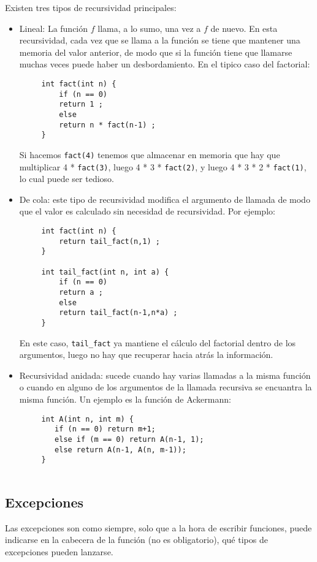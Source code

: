 \documentclass[a4paper]{article}
\begin{document}
	 Existen tres tipos de recursividad principales:
	 \begin{itemize}
	 \item Lineal: La función $f$ llama, a lo sumo, una vez a $f$ de nuevo. En esta recursividad, cada vez que se llama a la función se tiene que mantener una memoria del valor anterior, de modo que si la función tiene que llamarse muchas veces puede haber un desbordamiento. En el tipico caso del factorial:
	 \begin{verbatim}
	 int fact(int n) {
		 if (n == 0)
		 return 1 ;
		 else
		 return n * fact(n-1) ;
	 }
	 \end{verbatim}
	 Si hacemos \verb|fact(4)| tenemos que almacenar en memoria que hay que multiplicar 4 * \verb|fact(3)|, luego 4 * 3 * \verb|fact(2)|, y luego 4 * 3 * 2 * \verb|fact(1)|, lo cual puede ser tedioso.
	 \item De cola: este tipo de recursividad modifica el argumento de llamada de modo que el valor es calculado sin necesidad de recursividad. Por ejemplo:
	 \begin{verbatim}
	 int fact(int n) {
		 return tail_fact(n,1) ;
	 }
	 
	 int tail_fact(int n, int a) {
		 if (n == 0)
		 return a ;
		 else
		 return tail_fact(n-1,n*a) ;
	 }
	 \end{verbatim}
	 
	 En este caso, \verb|tail_fact| ya mantiene el cálculo del factorial dentro de los argumentos, luego no hay que recuperar hacia atrás la información.
	 
	 \item Recursividad anidada: sucede cuando hay varias llamadas a la misma función o cuando en alguno de los argumentos de la llamada recursiva se encuantra la misma función. Un ejemplo es la función de Ackermann:
	 	 \begin{verbatim}
	 int A(int n, int m) {
	 	if (n == 0) return m+1;
	 	else if (m == 0) return A(n-1, 1);
	 	else return A(n-1, A(n, m-1));
	 }
	
	 \end{verbatim}
	 \end{itemize}
	 
	 \subsection{Excepciones}
	 Las excepciones son como siempre, solo que a la hora de escribir funciones, puede indicarse en la cabecera de la función (no es obligatorio), qué tipos de excepciones pueden lanzarse.
	 
\end{document}
